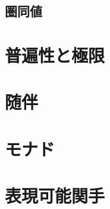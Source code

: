 \documentclass[dvipdfmx]{jsbook}
\theoremstyle{plain}
\begin{document}
\chapter{圏同値}


\part{普遍性と極限}

\part{随伴}

\part{モナド}

\part{表現可能関手}

\appendix

\printindex
\end{document}
